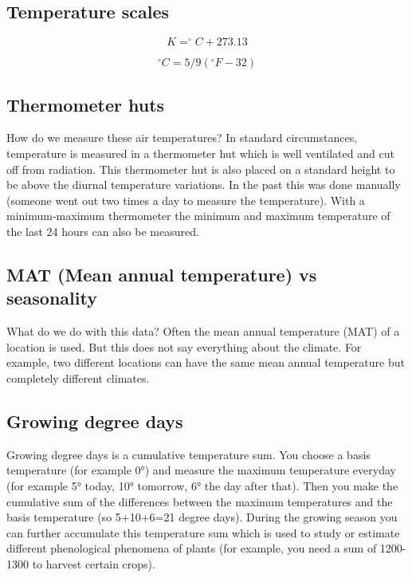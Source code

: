 \documentclass[oneside]{book}
\begin{document}
\subsection{Temperature scales}\label{temperature-scales}

\begin{equation} 
   K = ^{\circ}C + 273.13
   \label{eq:EqK}
\end{equation}

\begin{equation} 
   ^{\circ}C = 5/9 \left(^{\circ}F - 32 \right)
   \label{eq:EqF}
\end{equation}

\subsection{Thermometer huts}\label{thermometer-huts}

How do we measure these air temperatures? In standard circumstances,
temperature is measured in a thermometer hut which is well ventilated
and cut off from radiation. This thermometer hut is also placed on a
standard height to be above the diurnal temperature variations. In the
past this was done manually (someone went out two times a day to measure
the temperature). With a minimum-maximum thermometer the minimum and
maximum temperature of the last 24 hours can also be measured.

\subsection{MAT (Mean annual temperature) vs
seasonality}\label{mat-mean-annual-temperature-vs-seasonality}

What do we do with this data? Often the mean annual temperature (MAT) of
a location is used. But this does not say everything about the climate.
For example, two different locations can have the same mean annual
temperature but completely different climates.

\subsection{Growing degree days}\label{growing-degree-days}

Growing degree days is a cumulative temperature sum. You choose a basis
temperature (for example 0°) and measure the maximum temperature
everyday (for example 5° today, 10° tomorrow, 6° the day after that).
Then you make the cumulative sum of the differences between the maximum
temperatures and the basis temperature (so 5+10+6=21 degree days).
During the growing season you can further accumulate this temperature
sum which is used to study or estimate different phenological phenomena
of plants (for example, you need a sum of 1200-1300 to harvest certain
crops).
\end{document}
